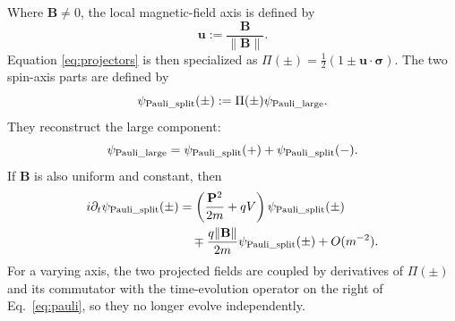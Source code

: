 \documentclass[10pt,letterpaper]{article}
\let\STAamsmathtext\text
\newcommand{\eqtext}[1]{\STAamsmathtext{\normalfont\rmfamily #1}}
\renewcommand{\text}[1]{\STAamsmathtext{\normalfont\rmfamily #1}}
\newcommand{\pv}[1]{#1}
\newcommand{\vct}[1]{\mathbf{#1}}
\newcommand{\sigv}{\vct{\pv{\bm{\sigma}}}}
\begin{document}
Where \(\vct{B}\ne0\), the local magnetic-field axis is defined by
\begin{equation}
\vct{u}:=\frac{\vct{B}}{\|\vct{B}\|}.
\label{eq:magnetic-axis}
\end{equation}
Equation \eqref{eq:projectors} is then specialized as
\(\pv{\Pi}(\pm)=\tfrac12(1\pm\vct{u}\cdot\sigv)\).
The two spin-axis parts are defined by
\begin{equation}
\pv{\psi}_{\eqtext{Pauli\_split}}(\pm)
:=\pv{\Pi}(\pm)\pv{\psi}_{\eqtext{Pauli\_large}}.
\label{eq:pauli-spin-decomposition}
\end{equation}
They reconstruct the large component:
\begin{equation}
\pv{\psi}_{\eqtext{Pauli\_large}}
=\pv{\psi}_{\eqtext{Pauli\_split}}(+)
+\pv{\psi}_{\eqtext{Pauli\_split}}(-).
\label{eq:pauli-spin-reconstruction}
\end{equation}
If \(\vct{B}\) is also uniform and constant, then
\begin{align}
i\partial_t\pv{\psi}_{\eqtext{Pauli\_split}}(\pm)
&=\left(\frac{\vct{P}^2}{2m}+qV\right)
\pv{\psi}_{\eqtext{Pauli\_split}}(\pm)\notag\\
&\quad\mp\frac{q\|\vct{B}\|}{2m}
\pv{\psi}_{\eqtext{Pauli\_split}}(\pm)+O(m^{-2}).
\label{eq:pauli-spin-split}
\end{align}
For a varying axis, the two projected fields are coupled by derivatives of
\(\pv{\Pi}(\pm)\) and its commutator with the time-evolution operator on the
right of Eq.\ \eqref{eq:pauli}, so they no longer evolve independently.
\end{document}
